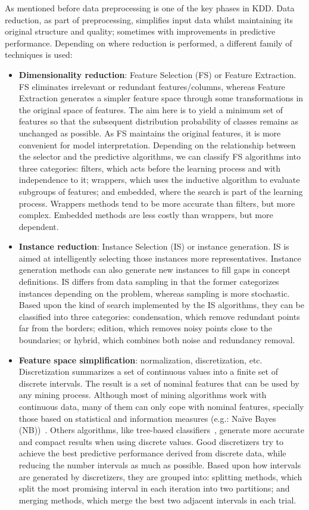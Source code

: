 \documentclass[preprint,12pt]{elsarticle}
\begin{document}
As mentioned before data preprocessing is one of the key phases in KDD. Data reduction, as part of preprocessing, simplifies input data whilst maintaining its original structure and quality; sometimes with improvements in predictive performance. Depending on where reduction is performed, a different family of techniques is used:

\begin{itemize}
	\item \textbf{Dimensionality reduction}: Feature Selection (FS) or Feature Extraction. FS eliminates irrelevant or redundant features/columns, whereas Feature Extraction generates a simpler feature space through some transformations in the original space of features. The aim here is to yield a minimum set of features so that the subsequent distribution probability of classes remains as unchanged as possible. As FS maintains the
original features, it is more convenient for model interpretation. Depending on the relationship between the selector and the predictive algorithms, we can classify FS algorithms into three categories: filters, which acts before the learning process and with independence to it; wrappers, which uses the inductive algorithm to evaluate subgroups of features; and embedded, where the search is part of the learning process. Wrappers methods tend to be more accurate than filters, but more complex. Embedded methods are less costly than wrappers, but more dependent.
	\item \textbf{Instance reduction}: Instance Selection (IS) or instance generation. IS is aimed at intelligently selecting those instances more representatives. Instance generation methods can also generate new instances to fill gaps in concept definitions. IS differs from data sampling in that the former categorizes instances depending on the problem, whereas sampling is more stochastic. Based upon the kind of search implemented by the IS algorithms, they can be classified into three categories: condensation, which remove redundant points far from the borders; edition, which removes noisy points close to the boundaries; or hybrid, which combines both noise and redundancy removal.
	\item \textbf{Feature space simplification}: normalization, discretization, etc. Discretization summarizes a set of continuous values into a finite set of discrete intervals. The result is a set of nominal features that can be used by any mining process. Although most of mining algorithms work with continuous data, many of them can only cope with nominal features, specially those based on statistical and information measures (e.g.: Na\"ive Bayes (NB))~\cite{yang09}. Others algorithms, like tree-based classifiers~\cite{hu09}, generate more accurate and compact results when using discrete values. Good discretizers try to achieve the best predictive performance derived from discrete data, while reducing the number intervals as much as possible. Based upon how intervals are generated by discretizers, they are grouped into: splitting methods, which split the most promising interval in each iteration into two partitions; and merging methods, which merge the best two adjacent intervals in each trial.
\end{itemize}
\end{document}
